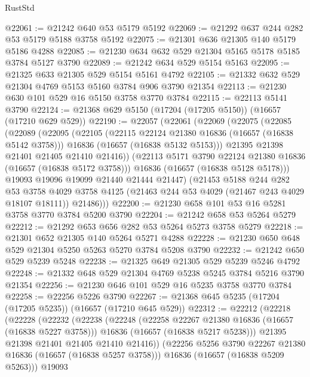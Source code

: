 \begin{lexlean}{RustStd}
\begin{coremodule}
@22061 := @21242 @640 @53 @5179 @5192
@22069 := @21292 @637 @244 @282 @53 @5179 @5188 @3758 @5192
@22075 := @21301 @636 @21305 @140 @5179 @5186 @4288
@22085 := @21230 @634 @632 @529 @21304 @5165 @5178 @5185 @3784 @5127 @3790
@22089 := @21242 @634 @529 @5154 @5163
@22095 := @21325 @633 @21305 @529 @5154 @5161 @4792
@22105 := @21332 @632 @529 @21304 @4769 @5153 @5160 @3784 @906 @3790 @21354
@22113 := @21230 @630 @101 @529 @16 @5150 @3758 @3770 @3784
@22115 := @22113 @5141 @3790
@22124 := @21368 @629 @5150 (@17204 (@17205 @5150)) (@16657 (@17210 @629 @529))
@22190 := @22057
    (@22061
      (@22069
        (@22075
          (@22085
            (@22089
              (@22095
                (@22105
                  (@22115 @22124 @21380 @16836 (@16657 (@16838 @5142 @3758)))
                  @16836
                  (@16657 (@16838 @5132 @5153)))
                @21395
                @21398
                @21401
                @21405
                @21410
                @21416))
            (@22113 @5171 @3790 @22124 @21380 @16836 (@16657 (@16838 @5172 @3758)))
            @16836
            (@16657 (@16838 @5128 @5178)))
          @19093
          @19096
          @19099
          @21440
          @21444
          @21447)
        (@21453
          @5188
          @244
          @282
          @53
          @3758
          @4029
          @3758
          @4125
          (@21463 @244 @53 @4029 (@21467 @243 @4029 @18107 @18111))
          @21486)))
@22200 := @21230 @658 @101 @53 @16 @5281 @3758 @3770 @3784 @5200 @3790
@22204 := @21242 @658 @53 @5264 @5279
@22212 := @21292 @653 @656 @282 @53 @5264 @5273 @3758 @5279
@22218 := @21301 @652 @21305 @140 @5264 @5271 @4288
@22228 := @21230 @650 @648 @529 @21304 @5250 @5263 @5270 @3784 @5208 @3790
@22232 := @21242 @650 @529 @5239 @5248
@22238 := @21325 @649 @21305 @529 @5239 @5246 @4792
@22248 := @21332 @648 @529 @21304 @4769 @5238 @5245 @3784 @5216 @3790 @21354
@22256 := @21230 @646 @101 @529 @16 @5235 @3758 @3770 @3784
@22258 := @22256 @5226 @3790
@22267 := @21368 @645 @5235 (@17204 (@17205 @5235)) (@16657 (@17210 @645 @529))
@22312 := @22212
    (@22218
      (@22228
        (@22232
          (@22238
            (@22248
              (@22258 @22267 @21380 @16836 (@16657 (@16838 @5227 @3758)))
              @16836
              (@16657 (@16838 @5217 @5238)))
            @21395
            @21398
            @21401
            @21405
            @21410
            @21416))
        (@22256 @5256 @3790 @22267 @21380 @16836 (@16657 (@16838 @5257 @3758)))
        @16836
        (@16657 (@16838 @5209 @5263)))
      @19093

\end{coremodule}
\end{lexlean}
